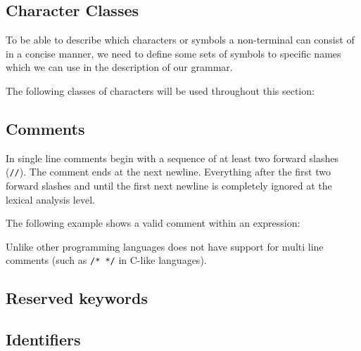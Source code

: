 \subsection{Character Classes}
To be able to describe which characters or symbols a non-terminal can consist of in a concise manner, we need to define some sets of symbols to specific names which we can use in the description of our grammar.

The following classes of characters will be used throughout this section:

\begin{ebnf}
\end{ebnf}

\subsection{Comments}

In \productname{} single line comments begin with a sequence of at least two forward slashes (\texttt{//}).
The comment ends at the next newline. Everything after the first two forward slashes and until the first next
newline is completely ignored at the lexical analysis level.

The following example shows a valid comment within an expression:


Unlike other programming languages \productname{} does not have support for multi line comments (such as
\texttt{/* */} in C-like languages).

\subsection{Reserved keywords}

\begin{ebnf}
\end{ebnf}

\subsection{Identifiers}


